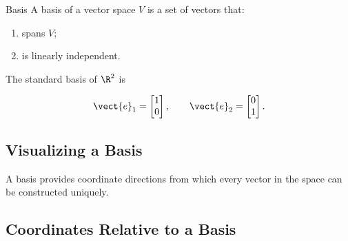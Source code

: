 \begin{definitionbox}{Basis}
A basis of a vector space \(V\) is a set of vectors that:
\begin{enumerate}
    \item spans \(V\);
    \item is linearly independent.
\end{enumerate}
\end{definitionbox}

The standard basis of \(\R^2\) is

\[ \vect{e}_1=\begin{bmatrix}1\\0\end{bmatrix},\qquad
\vect{e}_2=\begin{bmatrix}0\\1\end{bmatrix}. \]

\subsection{Visualizing a Basis}
\label{subsec:visual-basis}

\begin{center}
\end{center}

A basis provides coordinate directions from which every vector in the space
can be constructed uniquely.

\subsection{Coordinates Relative to a Basis}
\label{subsec:coordinates-basis}

